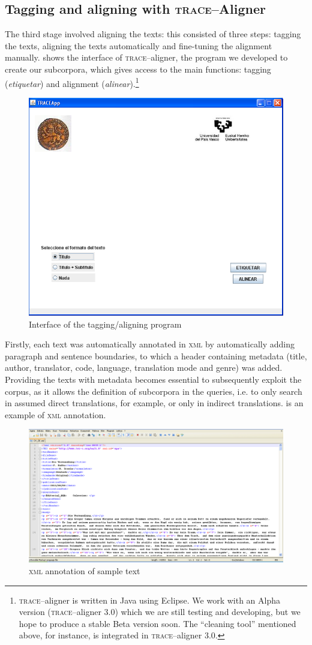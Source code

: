 \documentclass[output=paper]{LSP/langsci}
\begin{document}
\subsection{Tagging and aligning with \textsc{trace}--Aligner}

The third stage involved aligning the texts: this consisted of three steps: tagging the texts, aligning the texts automatically and fine-tuning the alignment manually.  shows the interface of \textsc{trace}--aligner, the program we developed to create our subcorpora, which gives access to the main functions: tagging (\textit{etiquetar}) and alignment (\textit{alinear}).\footnote{\textsc{trace}--aligner is written in Java using Eclipse. We work with an Alpha version (\textsc{trace}--aligner 3.0) which we are still testing and developing, but we hope to produce a stable Beta version soon. The “cleaning tool” mentioned above, for instance, is integrated in \textsc{trace}--aligner 3.0.} 

\begin{figure} 
\includegraphics[width=.5\textwidth]{./figures/6-1.png}
\caption{Interface of the tagging/aligning program} \label{fig:3:1}
\end{figure}

Firstly, each text was automatically annotated in \textsc{xml} by automatically adding paragraph and sentence boundaries, to which a header containing metadata (title, author, translator, code, language, translation mode and genre) was added. Providing the texts with metadata becomes essential to subsequently exploit the corpus, as it allows the definition of subcorpora in the queries, i.e. to only search in assumed direct translations, for example, or only in indirect translations.  is an example of \textsc{xml} annotation.

\begin{figure}[t]
\includegraphics[width=1.0\textwidth]{./figures/6-2.png}
\caption{\textsc{xml} annotation of sample text} \label{fig:3:2}
\end{figure}
\end{document}
